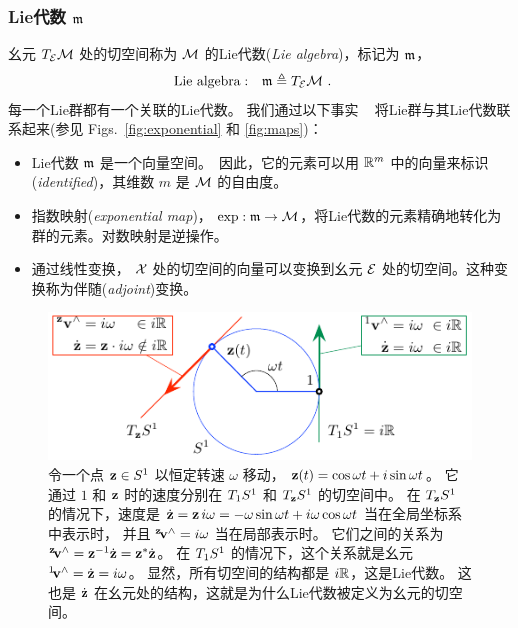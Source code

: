 \subsubsection[The Lie algebra]{Lie代数 $\frak{m}$}

幺元 $\mtanat{\cM}{\cE}$ 处的切空间称为 $\cM$ 的Lie代数(\emph{Lie algebra})，标记为 $\frak{m}$，
%
\begin{align}
\textrm{Lie algebra}&:&\frak{m} &\te \mtanat{\cM}{\cE}~.
\end{align}
%
每一个Lie群都有一个关联的Lie代数。
我们通过以下事实 ~\cite{EADE-Lie} 将Lie群与其Lie代数联系起来(参见 Figs.~\ref{fig:exponential} 和 \ref{fig:maps})：
\begin{itemize}
\item
Lie代数 $\frak{m}$ 是一个向量空间。\footnotemark\ 
因此，它的元素可以用 $\bbR^m$ 中的向量来标识(\emph{identified})，其维数 $m$ 是 $\cM$ 的自由度。
\item
指数映射(\emph{exponential map})， $\exp:\frak{m}\to\cM$，将Lie代数的元素精确地转化为群的元素。对数映射是逆操作。
\item
通过线性变换， $\cX$ 处的切空间的向量可以变换到幺元 $\cE$ 处的切空间。这种变换称为伴随(\emph{adjoint})变换。
\end{itemize}
%
%


\begin{figure}[tb]
\centering
\includegraphics{figures/lie_algebra_S1}
\caption{%
令一个点 $\bfz\in S^1$ 以恒定转速 $\omega$ 移动， $\bfz(t)=\cos\omega t+i\sin\omega t$。
它通过 $1$ 和 $\bfz$ 时的速度分别在 $\mtanat{S^1}{1}$ 和 $\mtanat{S^1}{\bfz}$ 的切空间中。
在 $\mtanat{S^1}{\bfz}$ 的情况下，速度是 $\dot\bfz=\bfz \,i\omega = -\omega\sin\omega t + i\omega\cos\omega t$ 当在全局坐标系中表示时， 并且 ${^\bfz}\!\bfv\hhat=i\omega$ 当在局部表示时。
它们之间的关系为 ${^\bfz}\!\bfv\hhat=\bfz\inv\dot\bfz=\bfz^*\dot\bfz$。
在 $\mtanat{S^1}{1}$ 的情况下，这个关系就是幺元 ${^1}\!\bfv\hhat=\dot\bfz=i\omega$。
显然，所有切空间的结构都是 $i\bbR$，这是Lie代数。
这也是 $\dot\bfz$ 在幺元处的结构，这就是为什么Lie代数被定义为幺元的切空间。
}
\label{fig:global_local_tangent}
\end{figure}


